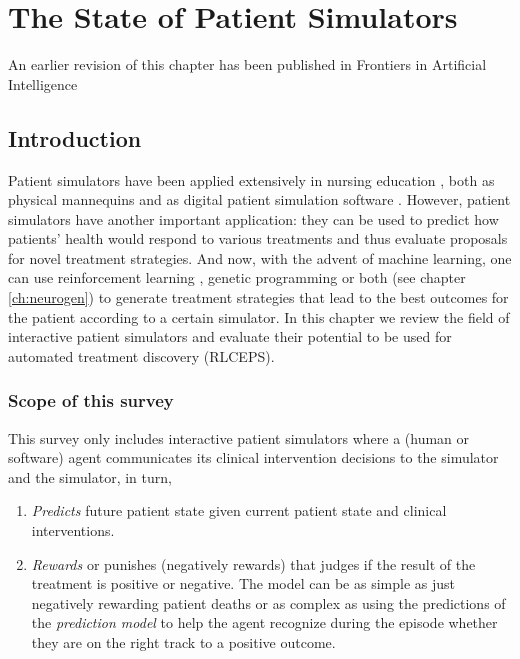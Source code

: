 \chapter{The State of Patient Simulators}
\label{ch:simulators-sota}

\begin{remark}
    An earlier revision of this chapter \cite[section 2]{liventsevEffectivePatientSimulators2021} has been published in Frontiers in Artificial Intelligence
\end{remark}

\section{Introduction}
\label{sec:intro}

Patient simulators have been applied extensively in nursing education \cite{didactic-sims1,didactic-sims2,didactic-sims3}, both as physical mannequins and as digital patient simulation software \cite{didactic-virtual}.
However, patient simulators have another important application: they can be used to predict how patients' health would respond to various treatments and thus evaluate proposals for novel treatment strategies.
And now, with the advent of machine learning, one can use reinforcement learning \cite{yuReinforcementLearningHealthcare2021}, genetic programming or both (see chapter \ref{ch:neurogen}) to generate treatment strategies that lead to the best outcomes for the patient according to a certain simulator.
In this chapter we review the field of interactive patient simulators and evaluate their potential to be used for automated treatment discovery (RLCEPS).

\subsection{Scope of this survey}
\label{sec:scope}

This survey only includes interactive patient simulators where a (human or software) agent communicates its clinical intervention decisions to the simulator and the simulator, in turn,
\begin{enumerate}
    \item \emph{Predicts} future patient state given current patient state and clinical interventions.
    \item \emph{Rewards} or punishes (negatively rewards) that judges if the result of the treatment is positive or negative. The model can be as simple as just negatively rewarding patient deaths or as complex as using the predictions of the \emph{prediction model} to help the agent recognize during the episode whether they are on the right track to a positive outcome.
\end{enumerate}

